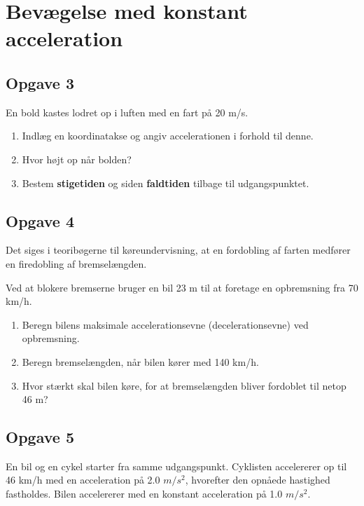 \documentclass[a4paper, 12pt]{article}
\begin{document}
\section*{Bevægelse med konstant acceleration}
\label{sec:org20abcae}

\subsection*{Opgave 3}
\label{sec:org44fbfed}

En bold kastes lodret op i luften med en fart på 20 m/s.

\begin{enumerate}
\item Indlæg en koordinatakse og angiv accelerationen i forhold til denne.

\item Hvor højt op når bolden?

\item Bestem \textbf{stigetiden} og siden \textbf{faldtiden} tilbage til udgangspunktet.
\end{enumerate}

\subsection*{Opgave 4}
\label{sec:org9486c67}

Det siges i teoribøgerne til køreundervisning, at en fordobling af farten medfører en firedobling af bremselængden.

Ved at blokere bremserne bruger en bil 23 m til at foretage en opbremsning fra 70 km/h.

\begin{enumerate}
\item Beregn bilens maksimale accelerationsevne (decelerationsevne) ved opbremsning.

\item Beregn bremselængden, når bilen kører med 140 km/h.

\item Hvor stærkt skal bilen køre, for at bremselængden bliver fordoblet til netop 46 m?
\end{enumerate}

\subsection*{Opgave 5}
\label{sec:org26ea9db}

En bil og en cykel starter fra samme udgangspunkt. Cyklisten accelererer op til 46 km/h med en acceleration på 2.0 \(m/s^2\), hvorefter den opnåede hastighed fastholdes. Bilen accelererer med en konstant acceleration på 1.0 \(m/s^2\).
\end{document}
